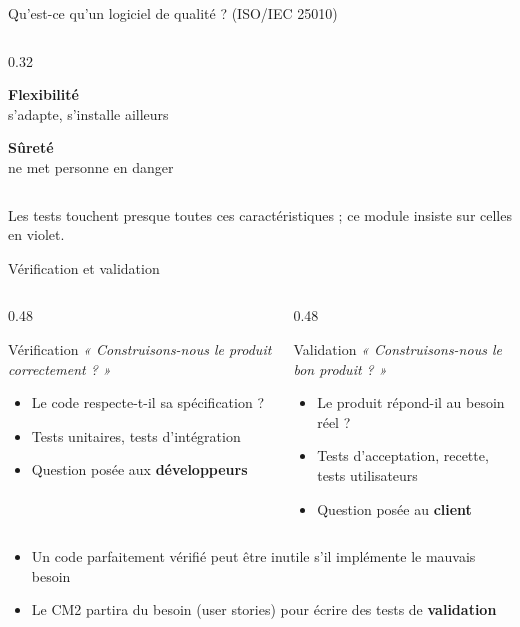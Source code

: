 \documentclass[aspectratio=169,10pt]{beamer}
\begin{document}
\begin{frame}{Qu'est-ce qu'un logiciel de qualité ? (ISO/IEC 25010)}
\begin{columns}[T]
\begin{column}{0.32\textwidth}
\begin{datacard}
        \textbf{Flexibilité}\\[-0.5mm]
        {\scriptsize\color{qamuted} s'adapte, s'installe ailleurs}
      \end{datacard}
      \begin{datacard}
        \textbf{Sûreté}\\[-0.5mm]
        {\scriptsize\color{qamuted} ne met personne en danger}
      \end{datacard}
    \end{column}
  \end{columns}
  \vspace{2mm}
  \begin{center}
    Les tests touchent presque toutes ces caractéristiques ; ce module insiste sur celles \textcolor{qaaccent}{en violet}.
  \end{center}
\end{frame}

\begin{frame}{Vérification et validation}
  \begin{columns}[T]
    \begin{column}{0.48\textwidth}
      \begin{block}{Vérification}
        \textit{« Construisons-nous le produit correctement ? »}
        \begin{itemize}
          \item Le code respecte-t-il sa spécification ?
          \item Tests unitaires, tests d'intégration
          \item Question posée aux \textbf{développeurs}
        \end{itemize}
      \end{block}
    \end{column}
    \begin{column}{0.48\textwidth}
      \begin{block}{Validation}
        \textit{« Construisons-nous le bon produit ? »}
        \begin{itemize}
          \item Le produit répond-il au besoin réel ?
          \item Tests d'acceptation, recette, tests utilisateurs
          \item Question posée au \textbf{client}
        \end{itemize}
      \end{block}
    \end{column}
  \end{columns}
  \vspace{4mm}
  \begin{itemize}
    \item Un code parfaitement vérifié peut être inutile s'il implémente le mauvais besoin
    \item Le CM2 partira du besoin (user stories) pour écrire des tests de \textbf{validation}
  \end{itemize}
\end{frame}
\end{document}
